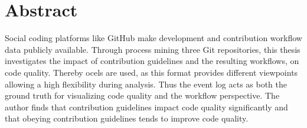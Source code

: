 \chapter*{Abstract}

Social coding platforms like GitHub make development and contribution workflow data publicly available. Through process mining three Git repositories, this thesis investigates the impact of contribution guidelines and the resulting workflows, on code quality. Thereby \acp{ocel} are used, as this format provides different viewpoints allowing a high flexibility during analysis. Thus the event log acts as both the ground truth for visualizing code quality and the workflow perspective. The author finds that contribution guidelines impact code quality significantly and that obeying contribution guidelines tends to improve code quality.